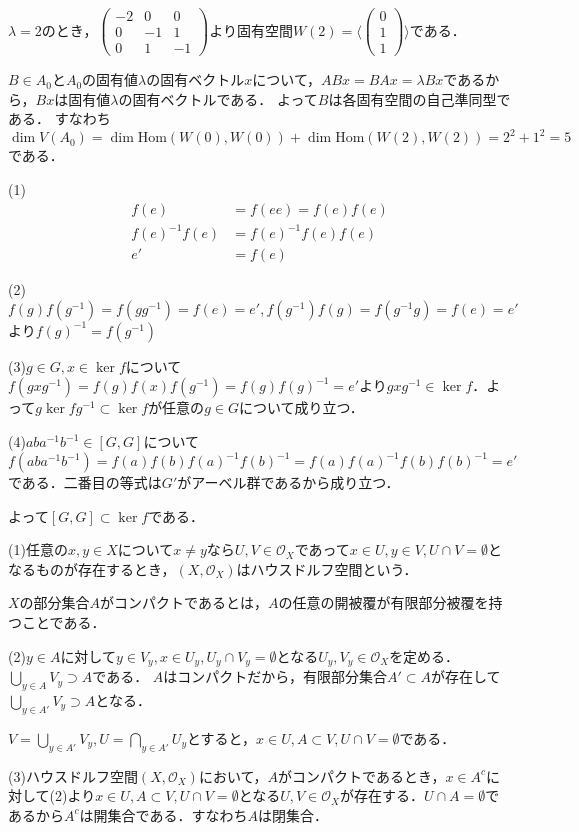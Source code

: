 \documentclass[
		book,
		head_space=20mm,
		foot_space=20mm,
		gutter=10mm,
		line_length=190mm
]{jlreq}
\begin{document}
$\lambda=2$のとき，$\begin{pmatrix}
    -2 & 0 & 0 \\
    0 & -1 & 1 \\
    0 & 1 & -1
    \end{pmatrix}$より固有空間$W(2)= \langle \begin{pmatrix}
    0 \\
    1 \\
    1
    \end{pmatrix} \rangle $である．

    $B \in A_0$と$A_0$の固有値$\lambda$の固有ベクトル$x$について，$ABx=BAx=\lambda Bx$であるから，$Bx$は固有値$\lambda$の固有ベクトルである．
    よって$B$は各固有空間の自己準同型である．
    すなわち$\dim V(A_0)= \dim \mathrm{Hom}(W(0),W(0))+\dim \mathrm{Hom}(W(2),W(2))=2^2+1^2=5$である．

(1)\begin{align}
    f(e)&=f(ee)=f(e)f(e) \\
    f(e)^{-1}f(e)&=f(e)^{-1}f(e)f(e)\\
    e'&=f(e)
\end{align}

(2)$f(g)f(g^{-1})=f(gg^{-1})=f(e)=e',f(g^{-1})f(g)=f(g^{-1}g)=f(e)=e'$より$f(g)^{-1}=f(g^{-1})$

(3)$g\in G,x\in \ker f$について$f(gxg^{-1})=f(g)f(x)f(g^{-1})=f(g)f(g)^{-1}=e'$より$gxg^{-1}\in \ker f$．よって$g\ker f g^{-1}\subset \ker f$が任意の$g\in G$について成り立つ．

(4)$aba^{-1}b^{-1}\in[G,G]$について$f(aba^{-1}b^{-1})=f(a)f(b)f(a)^{-1}f(b)^{-1}=f(a)f(a)^{-1}f(b)f(b)^{-1}=e'$である．二番目の等式は$G'$がアーベル群であるから成り立つ．

よって$[G,G]\subset \ker f$である．

(1)任意の$x,y \in X$について$x\neq y$なら$U,V \in \mathcal{O}_X$であって$x\in U, y \in V, U\cap V = \emptyset$となるものが存在するとき，$(X,\mathcal{O}_X)$はハウスドルフ空間という．

$X$の部分集合$A$がコンパクトであるとは，$A$の任意の開被覆が有限部分被覆を持つことである．

(2)$y \in A$に対して$y\in V_y,x\in U_y, U_y \cap V_y = \emptyset$となる$U_y,V_y \in \mathcal{O}_X$を定める．$\bigcup\limits_{y\in A} V_y \supset A$である．
$A$はコンパクトだから，有限部分集合$A'\subset A$が存在して$\bigcup\limits_{y\in A'} V_y \supset A$となる．

$V=\bigcup\limits_{y\in A'} V_y,U=\bigcap\limits_{y\in A'} U_y$とすると，$x\in U,A\subset V,U\cap V=\emptyset$である．

(3)ハウスドルフ空間$(X,\mathcal{O}_X)$において，$A$がコンパクトであるとき，$x\in A^c$に対して(2)より$x\in U, A\subset V, U\cap V=\emptyset$となる$U,V \in \mathcal{O}_X$が存在する．$U\cap A = \emptyset$であるから$A^c$は開集合である．すなわち$A$は閉集合．
\end{document}
